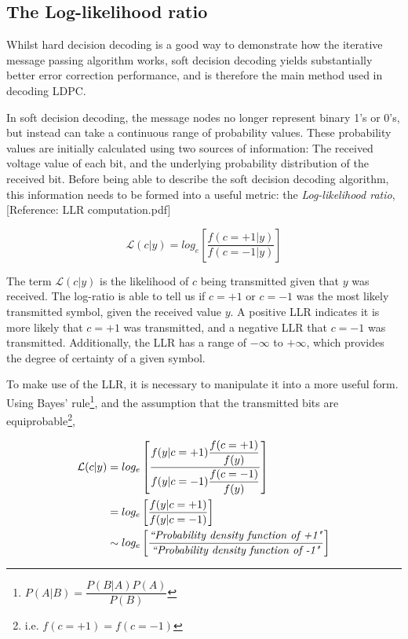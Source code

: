 \documentclass[11pt]{article}
\numberwithin{equation}{subsection}
\begin{document}
\subsection{The Log-likelihood ratio} \label{section:LLR}
Whilst hard decision decoding is a good way to demonstrate how the iterative message passing algorithm works, soft decision decoding yields substantially better error correction performance, and is therefore the main method used in decoding LDPC.

In soft decision decoding, the message nodes no longer represent binary 1's or 0's, but instead can take a continuous range of probability values. These probability values are initially calculated using two sources of information: The received voltage value of each bit, and the underlying probability distribution of the received bit. Before being able to describe the soft decision decoding algorithm, this information needs to be formed into a useful metric: the \textit{Log-likelihood ratio}, [Reference: LLR computation.pdf]

\begin{equation} \label{eq:LLR}
\mathcal{L}(c|y) = log_e \left[ \dfrac{f(c=+1|y)}{f(c=-1|y)} \right]
\end{equation}

\noindent The term $\mathcal{L}(c|y)$ is the likelihood of $c$ being transmitted given that $y$ was received. The log-ratio is able to tell us if $c=+1$ or $c=-1$ was the most likely transmitted symbol, given the received value $y$. A positive LLR indicates it is more likely that $c=+1$ was transmitted, and a negative LLR that $c=-1$ was transmitted. Additionally, the LLR has a range of $-\infty$ to $+\infty$, which provides the degree of certainty of a given symbol.

To make use of the LLR, it is necessary to manipulate it into a more useful form. Using Bayes' rule\footnote{$P(A|B) = \dfrac{P(B|A) P(A)}{P(B)}$}, and the assumption that the transmitted bits are equiprobable\footnote{i.e. $f(c=+1) = f(c=-1)$},

\begin{equation}
\begin{aligned}
\mathcal{L}(c|y) &= log_e \left[ \dfrac{f(y|c=+1) \dfrac{f(c=+1)}{f(y)}}{f(y|c=-1) \dfrac{f(c=-1)}{f(y)}} \right] 
\\
&= log_e \left[ \dfrac{f(y|c=+1)} {f(y|c=-1)} \right] 
\\
&\sim log_e \left[ \dfrac{\text{\textit{``Probability density function of +1"}}}{\text{\textit{``Probability density function of -1"}}} \right]
\end{aligned}
\end{equation}
\end{document}
